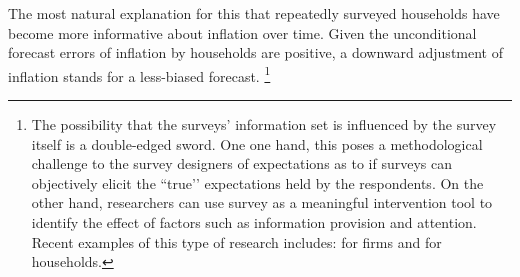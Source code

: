 \documentclass[12pt]{article}
\begin{document}
   The most natural explanation for this that repeatedly surveyed households have become more informative about inflation over time. Given the unconditional forecast errors of inflation by households are positive, a downward adjustment of inflation stands for a less-biased forecast.   \footnote{The possibility that the surveys' information set is influenced by the survey itself is a double-edged sword. One one hand, this poses a methodological challenge to the survey designers of expectations as to if surveys can objectively elicit the ``true’’ expectations held by the respondents. On the other hand, researchers can use survey as a meaningful intervention tool to identify the effect of factors such as information provision and attention. Recent examples of this type of research includes: \citet{coibion2018firms} for firms and \citet{coibion2019monetary} for households.}
    
\end{document}

